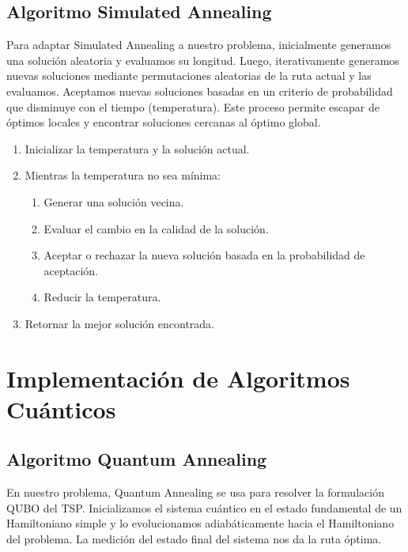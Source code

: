 \documentclass[11pt,a4paper,spanish]{book}
\begin{document}
\subsection{Algoritmo Simulated Annealing}

Para adaptar Simulated Annealing a nuestro problema, inicialmente generamos una solución aleatoria y evaluamos su longitud. Luego, iterativamente generamos nuevas soluciones mediante permutaciones aleatorias de la ruta actual y las evaluamos. Aceptamos nuevas soluciones basadas en un criterio de probabilidad que disminuye con el tiempo (temperatura). Este proceso permite escapar de óptimos locales y encontrar soluciones cercanas al óptimo global.


\begin{tcolorbox}[colback=white!95!blue, colframe=blue!50!black, title=Algoritmo de Recocido Simulado (SA), fontupper=\ttfamily]
\begin{enumerate}
    \item Inicializar la temperatura y la solución actual.
    \item Mientras la temperatura no sea mínima:
    \begin{enumerate}
        \item Generar una solución vecina.
        \item Evaluar el cambio en la calidad de la solución.
        \item Aceptar o rechazar la nueva solución basada en la probabilidad de aceptación.
        \item Reducir la temperatura.
    \end{enumerate}
    \item Retornar la mejor solución encontrada.
\end{enumerate}
\end{tcolorbox}



\section{Implementación de Algoritmos Cuánticos}

\subsection{Algoritmo Quantum Annealing}

En nuestro problema, Quantum Annealing se usa para resolver la formulación QUBO del TSP. Inicializamos el sistema cuántico en el estado fundamental de un Hamiltoniano simple y lo evolucionamos adiabáticamente hacia el Hamiltoniano del problema. La medición del estado final del sistema nos da la ruta óptima.
\end{document}
